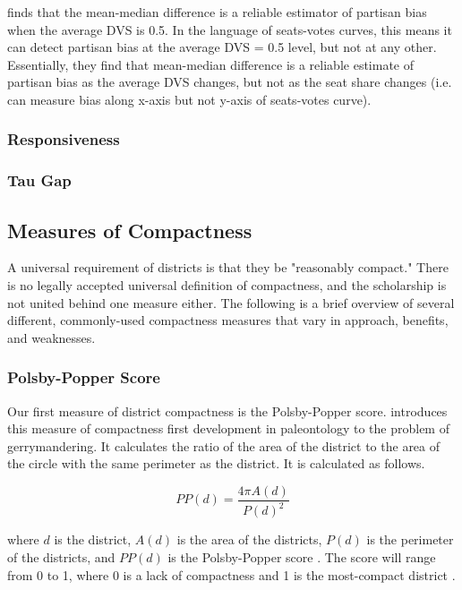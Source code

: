 \textcite{katz2020} finds that the mean-median difference is a reliable estimator of partisan bias when the average DVS is 0.5. In the language of seats-votes curves, this means it can detect partisan bias at the average DVS = 0.5 level, but not at any other. Essentially, they find that mean-median difference is a reliable estimate of partisan bias as the average DVS changes, but not as the seat share changes (i.e. can measure bias along x-axis but not y-axis of seats-votes curve). \parencite[27-9]{katz2020}

\subsubsection{Responsiveness}

\subsubsection{Tau Gap}

\subsection{Measures of Compactness}

A universal requirement of districts is that they be "reasonably compact." There is no legally accepted universal definition of compactness, and the scholarship is not united behind one measure either. The following is a brief overview of several different, commonly-used compactness measures that vary in approach, benefits, and weaknesses. 

\subsubsection{Polsby-Popper Score}

Our first measure of district compactness is the Polsby-Popper score. \textcite{polsby1991} introduces this measure of compactness first development in paleontology to the problem of gerrymandering. It calculates the ratio of the area of the district to the area of the circle with the same perimeter as the district. It is calculated as follows.

\begin{equation}
    PP(d) = \frac{4 \pi A(d)}{P(d)^2}
\end{equation}

where $d$ is the district, $A(d)$ is the area of the districts, $P(d)$ is the perimeter of the districts, and $PP(d)$ is the Polsby-Popper score \parencite{cox1927,polsby1991}. The score will range from 0 to 1, where 0 is a lack of compactness and 1 is the most-compact district \parencite{polsby1991}.

